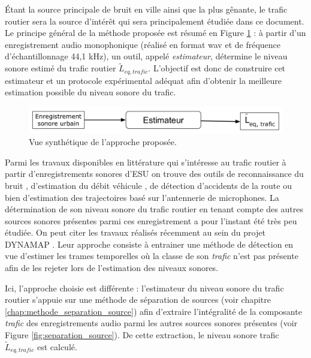 Étant la source principale de bruit en ville ainsi que la plus gênante,  le trafic routier sera la source d'intérêt qui sera principalement étudiée dans ce document. Le principe général de la méthode proposée est résumé en Figure \ref{fig:estimateur0} : à partir d'un enregistrement audio monophonique (réalisé en format wav et de fréquence d'échantillonnage 44,1 kHz), un outil, appelé \textit{estimateur}, détermine le niveau sonore estimé du trafic routier $\tilde{L}_{eq,trafic}$.
L'objectif est donc de construire cet estimateur et un protocole expérimental adéquat afin d'obtenir la meilleure estimation possible du niveau sonore du trafic.\\

\begin{figure}[ht]
\centering
\includegraphics[width=0.7\linewidth]{./figures/NMF/bloc_diagram_estimateur0.pdf}
\caption{Vue synthétique de l'approche proposée.}
\label{fig:estimateur0}
\end{figure}

Parmi les travaux disponibles en littérature qui s'intéresse au trafic routier à partir d'enregistrements sonores d'ESU on trouve des outils de reconnaissance du bruit \cite{defreville_automatic_2006}, d'estimation du débit véhicule \cite{torija2012using}, de détection d'accidents de la route \cite{harlow2001automated} ou bien d'estimation des trajectoires \cite{leiba2017large} basé sur l'antennerie de microphones.
La détermination de son niveau sonore du trafic routier en tenant compte des autres sources sonores présentes parmi ces enregistrement a pour l'instant été très peu étudiée. On peut citer les travaux réalisés récemment au sein du projet DYNAMAP \cite{socoro2017anomalous}. Leur approche consiste à entrainer une méthode de détection en vue d'estimer les trames temporelles où la classe de son \textit{trafic} n'est pas présente afin de les rejeter lors de l'estimation des niveaux sonores.

Ici, l'approche choisie est différente : l'estimateur du niveau sonore du trafic routier s'appuie sur une méthode de séparation de sources (voir chapitre \ref{chap:methode_separation_source}) afin d'extraire l'intégralité de la composante \textit{trafic} des enregistrements audio parmi les autres sources sonores présentes (voir Figure \ref{fig:separation_source}). De cette extraction, le niveau sonore trafic $\tilde{L}_{eq,trafic}$ est calculé.

